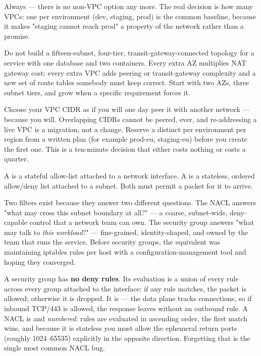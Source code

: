  Always --- there is no non-VPC option any more. The real decision is how many VPCs: one per environment (dev, staging, prod) is the common baseline, because it makes "staging cannot reach prod" a property of the network rather than a promise.

 Do not build a fifteen-subnet, four-tier, transit-gateway-connected topology for a service with one database and two containers. Every extra AZ multiplies NAT gateway cost; every extra VPC adds peering or transit-gateway complexity and a new set of route tables somebody must keep correct. Start with two AZs, three subnet tiers, and grow when a specific requirement forces it.

\begin{infranote}
Choose your VPC CIDR as if you will one day peer it with another network --- because you will. Overlapping CIDRs cannot be peered, ever, and re-addressing a live VPC is a migration, not a change. Reserve a distinct  per environment per region from a written plan (for example  prod-eu,  staging-eu) before you create the first one. This is a ten-minute decision that either costs nothing or costs a quarter.
\end{infranote}


 A  is a stateful allow-list attached to a network interface. A  is a stateless, ordered allow/deny list attached to a subnet. Both must permit a packet for it to arrive.

 Two filters exist because they answer two different questions. The NACL answers "what may cross this subnet boundary at all?" --- a coarse, subnet-wide, deny-capable control that a network team can own. The security group answers "what may talk to \emph{this workload}?" --- fine-grained, identity-shaped, and owned by the team that runs the service. Before security groups, the equivalent was maintaining iptables rules per host with a configuration-management tool and hoping they converged.

 A security group has \textbf{no deny rules}. Its evaluation is a union of every rule across every group attached to the interface: if any rule matches, the packet is allowed; otherwise it is dropped. It is  --- the data plane tracks connections, so if inbound TCP/443 is allowed, the response leaves without an outbound rule. A NACL is  and \emph{numbered}: rules are evaluated in ascending order, the first match wins, and because it is stateless you must allow the ephemeral return ports (roughly 1024--65535) explicitly in the opposite direction. Forgetting that is the single most common NACL bug.

